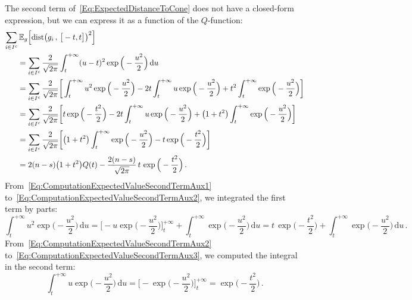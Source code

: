 \documentclass[letter,10pt]{article}
\theoremstyle{definition}
\theoremstyle{nonumberplain}
\begin{document}
The second term of~\eqref{Eq:ExpectedDistanceToCone} does not have a closed-form expression, but we can
express it as a function of the $Q$-function:
\begin{align}
    \sum_{i\in I^c}&\,\mathbb{E}_g\Big[ \text{dist}\big(g_i\,,\,\big[-t,t\big]\big)^2 \Big]
  \notag
  \\
  &=
    \sum_{i\in I^c} \frac{2}{\sqrt{2\pi}}
    \int_{t}^{+\infty} (u - t)^2 \exp\Big(-\frac{u^2}{2}\Big)\,\text{d}u
  \notag
  \\
  &=
    \sum_{i\in I^c} \frac{2}{\sqrt{2\pi}}
    \bigg[
      \int_{t}^{+\infty} u^2\exp\Big(-\frac{u^2}{2}\Big)
      -
      2t\int_{t}^{+\infty} u\exp\Big(-\frac{u^2}{2}\Big)
      +
      t^2\int_{t}^{+\infty} \exp\Big(-\frac{u^2}{2}\Big)
    \bigg]
  \label{Eq:ComputationExpectedValueSecondTermAux1}
  \\
  &=
    \sum_{i\in I^c} \frac{2}{\sqrt{2\pi}}
    \bigg[
      t\exp\Big(-\frac{t^2}{2}\Big)
      -
      2t\int_{t}^{+\infty} u\exp\Big(-\frac{u^2}{2}\Big)
      +
      \big(1+t^2\big)\int_{t}^{+\infty} \exp\Big(-\frac{u^2}{2}\Big)
    \bigg]
  \label{Eq:ComputationExpectedValueSecondTermAux2}
  \\
  &=
    \sum_{i\in I^c} \frac{2}{\sqrt{2\pi}}
    \bigg[
      \big(1+t^2\big)\int_{t}^{+\infty} \exp\Big(-\frac{u^2}{2}\Big)
      -
      t\exp\Big(-\frac{t^2}{2}\Big)
    \bigg]
  \label{Eq:ComputationExpectedValueSecondTermAux3}
  \\
  &=
    2(n-s)\big(1 + t^2\big)Q(t)
    -
    \frac{2(n-s)}{\sqrt{2\pi}}\,t\,\exp\Big(-\frac{t^2}{2}\Big)\,.
  \label{Eq:ComputationExpectedValueSecondTerm}
\end{align}
From~\eqref{Eq:ComputationExpectedValueSecondTermAux1}
to~\eqref{Eq:ComputationExpectedValueSecondTermAux2}, we integrated the first term by parts:
\begin{equation*}
  \int_{t}^{+\infty}u^2\exp\Big(-\frac{u^2}{2}\Big)\, \text{d}u
  =
  \bigg[-u\exp\Big(-\frac{u^2}{2}\Big)\bigg]_{t}^{+\infty}
  +
  \int_{t}^{+\infty}\exp\Big(-\frac{u^2}{2}\Big)\, \text{d}u
  =
  t\, \exp\Big(-\frac{t^2}{2}\Big) + \int_{t}^{+\infty}\exp\Big(-\frac{u^2}{2}\Big)\, \text{d}u\,.
\end{equation*}
From~\eqref{Eq:ComputationExpectedValueSecondTermAux2}
to~\eqref{Eq:ComputationExpectedValueSecondTermAux3}, we computed the integral in the second term:
\begin{equation*}
  \int_{t}^{+\infty}u\exp\Big(-\frac{u^2}{2}\Big)\, \text{d}u 
  =
  \bigg[-\exp\Big(-\frac{u^2}{2}\Big)\bigg]_{t}^{+\infty}
  =
  \exp\Big(-\frac{t^2}{2}\Big)\,.
\end{equation*}
\end{document}
